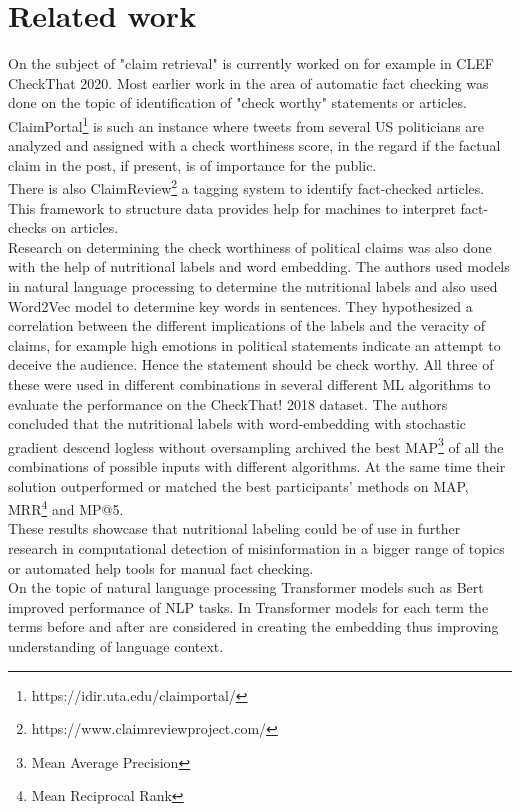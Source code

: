 \documentclass{article}
\begin{document}
\section{Related work}
On the subject of "claim retrieval" is currently worked on for example in CLEF CheckThat 2020\cite{DBLP:conf/ecir/Barron-CedenoEN20}.
Most earlier work in the area of automatic fact checking was done on the topic of identification of "check worthy" statements or articles.
ClaimPortal\footnote {https://idir.uta.edu/claimportal/}\cite{DBLP:conf/acl/MajithiaALJACL19} is such an instance where tweets from several US politicians are analyzed and assigned with a check worthiness score, in the regard if the factual claim in the post, if present, is of importance for the public.\\
There is also ClaimReview\footnote{https://www.claimreviewproject.com/} a tagging system to identify fact-checked articles.
This framework to structure data provides help for machines to interpret fact-checks on articles.\\
Research on determining the check worthiness of political claims was also done with the help of nutritional labels and word embedding\cite{DBLP:conf/sigir/LespagnolMU19}.
The authors used models in natural language processing to determine the nutritional labels and also used Word2Vec model to determine key words in sentences.
They hypothesized a correlation between the different implications of the labels and the veracity of claims, for example high emotions in political statements indicate an attempt to deceive the audience.
Hence the statement should be check worthy. 
All three of these were used in different combinations in several different ML algorithms to evaluate the performance on the CheckThat! 2018 \cite{DBLP:conf/clef/NakovBESMZAKM18} dataset.
The authors concluded that the nutritional labels with word-embedding with stochastic gradient descend logless without oversampling  archived the best MAP\footnote{Mean Average Precision} of all the combinations of possible inputs with different algorithms.
At the same time their solution outperformed or matched the best participants' methods on MAP, MRR\footnote{Mean Reciprocal Rank} and MP@5.\\
These results showcase that nutritional labeling could be of use in further research in computational detection of misinformation in a bigger range of topics or automated help tools for manual fact checking.\\
On the topic of natural language processing Transformer models such as Bert\cite{DBLP:conf/naacl/DevlinCLT19} improved performance of NLP tasks. In Transformer models for each term the terms before and after are considered in creating the embedding thus improving understanding of language context.
\end{document}
